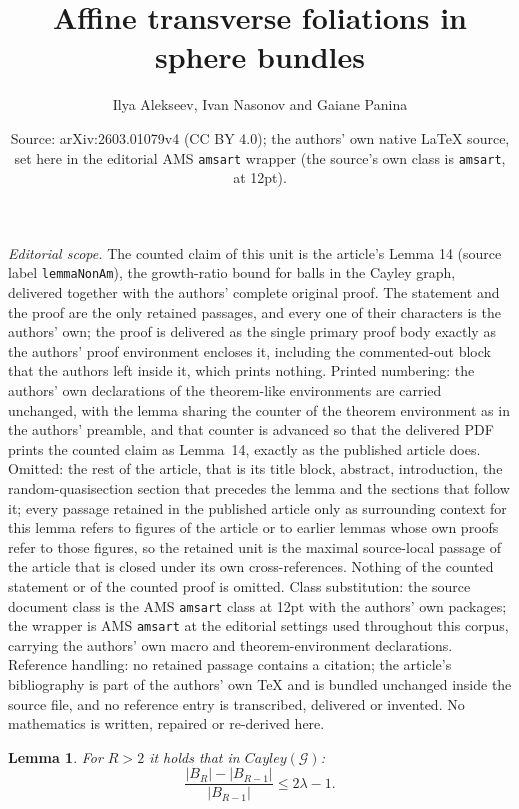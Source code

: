 \documentclass[10pt,a4paper]{amsart}
\title{Affine transverse foliations in sphere bundles}
\author{Ilya Alekseev, Ivan Nasonov and Gaiane Panina}
\date{Source: arXiv:2603.01079v4 (CC BY 4.0); the authors' own native \LaTeX{} source, set here in the editorial AMS \texttt{amsart} wrapper (the source's own class is \texttt{amsart}, at 12pt).}
\theoremstyle{plain}
\newtheorem{lemma}[theorem]{Lemma}
\theoremstyle{definition}
\begin{document}
\maketitle
\noindent\textit{Editorial scope.} The counted claim of this unit is the article's Lemma 14 (source label \texttt{lemmaNonAm}), the growth-ratio bound for balls in the Cayley graph, delivered together with the authors' complete original proof. The statement and the proof are the only retained passages, and every one of their characters is the authors' own; the proof is delivered as the single primary proof body exactly as the authors' proof environment encloses it, including the commented-out block that the authors left inside it, which prints nothing. Printed numbering: the authors' own declarations of the theorem-like environments are carried unchanged, with the lemma sharing the counter of the theorem environment as in the authors' preamble, and that counter is advanced so that the delivered PDF prints the counted claim as Lemma~14, exactly as the published article does. Omitted: the rest of the article, that is its title block, abstract, introduction, the random-quasisection section that precedes the lemma and the sections that follow it; every passage retained in the published article only as surrounding context for this lemma refers to figures of the article or to earlier lemmas whose own proofs refer to those figures, so the retained unit is the maximal source-local passage of the article that is closed under its own cross-references. Nothing of the counted statement or of the counted proof is omitted. Class substitution: the source document class is the AMS \texttt{amsart} class at 12pt with the authors' own packages; the wrapper is AMS \texttt{amsart} at the editorial settings used throughout this corpus, carrying the authors' own macro and theorem-environment declarations. Reference handling: no retained passage contains a citation; the article's bibliography is part of the authors' own TeX and is bundled unchanged inside the source file, and no reference entry is transcribed, delivered or invented. No mathematics is written, repaired or re-derived here.

\setcounter{theorem}{13}
    \begin{lemma}\label{lemmaNonAm} For $R>2$ it holds that in $Cayley(\mathcal{G})$:
    $$\dfrac{|B_R| - |B_{R-1}|}{|B_{R-1}|} \leq 2\lambda-1.$$ 
    
    \end{lemma}
\end{document}
